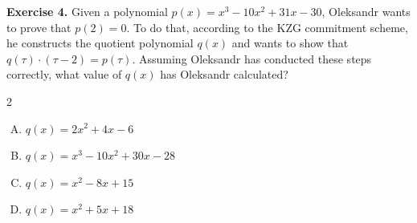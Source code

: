 \documentclass[../lecture-notes-148x210.tex]{subfiles}
\begin{document}
\textbf{Exercise 4.} Given a polynomial $p(x) = x^3 - 10x^2 + 31x - 30$, Oleksandr wants to prove that $p(2)=0$. 
To do that, according to the KZG commitment scheme, he constructs the quotient polynomial $q(x)$ and wants 
to show that $q(\tau) \cdot (\tau - 2) = p(\tau)$. Assuming Oleksandr has conducted these steps correctly, 
what value of $q(x)$ has Oleksandr calculated?

\vspace{-3mm}

\begin{multicols}{2}
    \begin{enumerate}[(A)]
        \item $q(x) = 2x^2 + 4x - 6$
        \item $q(x) = x^3 - 10x^2 + 30x - 28$
        \item $q(x) = x^2 - 8x + 15$
        \item $q(x) = x^2 + 5x + 18$
    \end{enumerate}
\end{multicols}
\end{document}
